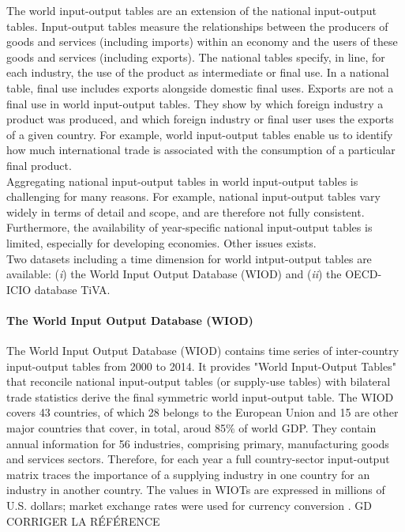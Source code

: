 \documentclass[11pt,a4paper]{article}
\begin{document}
The world input-output tables are an extension of the national input-output tables. Input-output tables measure the relationships between the producers of goods and services (including imports) within an economy and the users of these goods and services (including exports). The national tables specify, in line, for each industry, the use of the product as intermediate or final use. In a national table, final use includes exports alongside domestic final uses. Exports are not a final use in world input-output tables. They show by which foreign industry a product was produced, and which foreign industry or final user uses the exports of a given country. For example, world input-output tables enable us to identify how much international trade is associated with the consumption of a particular final product. \\
Aggregating national input-output tables in world input-output tables is challenging for many reasons. For example, national input-output tables vary widely in terms of detail and scope, and are therefore not fully consistent. Furthermore, the availability of year-specific national input-output tables is limited, especially for developing economies. Other issues exists. \\
Two datasets including a time dimension for world intput-output tables are available: (\textit{i}) the World Input Output Database (WIOD) and (\textit{ii}) the OECD-ICIO database TiVA.
\paragraph{The World Input Output Database (WIOD)}
The World Input Output Database (WIOD) contains time series of inter-country input-output tables from 2000 to 2014.  It provides "World Input-Output Tables" that reconcile national input-output tables (or supply-use tables) with bilateral trade statistics derive the final symmetric world input-output table. The WIOD covers 43 countries, of which 28 belongs to the European Union and 15 are other major countries that cover, in total, aroud 85$\%$ of world GDP. They contain annual information for 56 industries, comprising primary, manufacturing goods and services sectors. Therefore, for each year a full country-sector input-output matrix traces the importance of a supplying industry in one country for an industry in another country. The values in WIOTs are expressed in millions of U.S. dollars; market exchange rates were used for currency conversion \citep{TimmerIllustratedUserGuide2015}. 
GD CORRIGER LA RÉFÉRENCE
\end{document}
